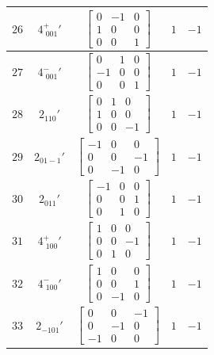 \documentclass[fleqn,8pt]{jsarticle}
\begin{document}
\begin{longtable}{ccccc}
$ 26 $ & $ 4^{+}_{\,\,001}{}' $ & $ \begin{bmatrix} 0 & -1 & 0 \\ 1 & 0 & 0 \\ 0 & 0 & 1 \end{bmatrix} $ & $ 1 $ & $ -1 $ \\ \hline
$ 27 $ & $ 4^{-}_{\,\,001}{}' $ & $ \begin{bmatrix} 0 & 1 & 0 \\ -1 & 0 & 0 \\ 0 & 0 & 1 \end{bmatrix} $ & $ 1 $ & $ -1 $ \\ \hline
$ 28 $ & $ 2{}_{110}{}' $ & $ \begin{bmatrix} 0 & 1 & 0 \\ 1 & 0 & 0 \\ 0 & 0 & -1 \end{bmatrix} $ & $ 1 $ & $ -1 $ \\ \hline
$ 29 $ & $ 2{}_{01-1}{}' $ & $ \begin{bmatrix} -1 & 0 & 0 \\ 0 & 0 & -1 \\ 0 & -1 & 0 \end{bmatrix} $ & $ 1 $ & $ -1 $ \\ \hline
$ 30 $ & $ 2{}_{011}{}' $ & $ \begin{bmatrix} -1 & 0 & 0 \\ 0 & 0 & 1 \\ 0 & 1 & 0 \end{bmatrix} $ & $ 1 $ & $ -1 $ \\ \hline
$ 31 $ & $ 4^{+}_{\,\,100}{}' $ & $ \begin{bmatrix} 1 & 0 & 0 \\ 0 & 0 & -1 \\ 0 & 1 & 0 \end{bmatrix} $ & $ 1 $ & $ -1 $ \\ \hline
$ 32 $ & $ 4^{-}_{\,\,100}{}' $ & $ \begin{bmatrix} 1 & 0 & 0 \\ 0 & 0 & 1 \\ 0 & -1 & 0 \end{bmatrix} $ & $ 1 $ & $ -1 $ \\ \hline
$ 33 $ & $ 2{}_{-101}{}' $ & $ \begin{bmatrix} 0 & 0 & -1 \\ 0 & -1 & 0 \\ -1 & 0 & 0 \end{bmatrix} $ & $ 1 $ & $ -1 $ \\ \hline

\end{longtable}
\end{document}
